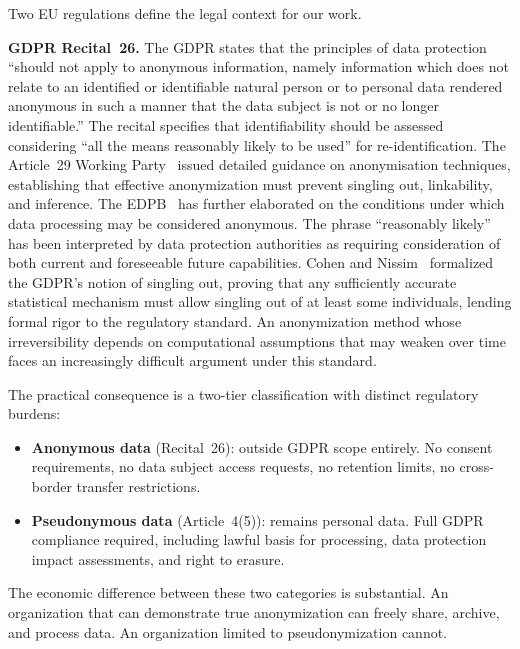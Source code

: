 \documentclass[journal]{IEEEtran}
\begin{document}
Two EU regulations define the legal context for our work.

\textbf{GDPR Recital~26.} The GDPR states that the principles of data protection ``should not apply to anonymous information, namely information which does not relate to an identified or identifiable natural person or to personal data rendered anonymous in such a manner that the data subject is not or no longer identifiable.'' The recital specifies that identifiability should be assessed considering ``all the means reasonably likely to be used'' for re-identification. The Article~29 Working Party~\cite{art29wp2014anonymisation} issued detailed guidance on anonymisation techniques, establishing that effective anonymization must prevent singling out, linkability, and inference. The EDPB~\cite{edpb2020guidelines} has further elaborated on the conditions under which data processing may be considered anonymous. The phrase ``reasonably likely'' has been interpreted by data protection authorities as requiring consideration of both current and foreseeable future capabilities. Cohen and Nissim~\cite{cohen2020singling} formalized the GDPR's notion of singling out, proving that any sufficiently accurate statistical mechanism must allow singling out of at least some individuals, lending formal rigor to the regulatory standard. An anonymization method whose irreversibility depends on computational assumptions that may weaken over time faces an increasingly difficult argument under this standard.

The practical consequence is a two-tier classification with distinct regulatory burdens:

\begin{itemize}
\item \textbf{Anonymous data} (Recital~26): outside GDPR scope entirely. No consent requirements, no data subject access requests, no retention limits, no cross-border transfer restrictions.
\item \textbf{Pseudonymous data} (Article~4(5)): remains personal data. Full GDPR compliance required, including lawful basis for processing, data protection impact assessments, and right to erasure.
\end{itemize}

The economic difference between these two categories is substantial. An organization that can demonstrate true anonymization can freely share, archive, and process data. An organization limited to pseudonymization cannot.
\end{document}
